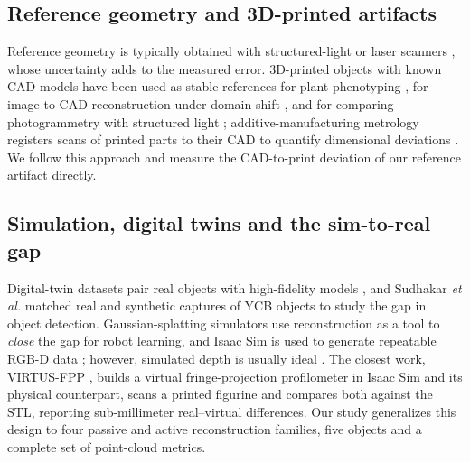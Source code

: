 \documentclass[journal]{IEEEtran}
\begin{document}
\subsection{Reference geometry and 3D-printed artifacts}
Reference geometry is typically obtained with structured-light or laser scanners
\cite{remondino2023critical,jutzi2023tls}, whose uncertainty adds to the measured error. 3D-printed objects
with known CAD models have been used as stable references for plant phenotyping \cite{boemer2024plant}, for
image-to-CAD reconstruction under domain shift \cite{realcad2026}, and for comparing photogrammetry with
structured light \cite{sensors2025industrial}; additive-manufacturing metrology registers scans of printed
parts to their CAD to quantify dimensional deviations \cite{jms2020printed}. We follow this approach and
measure the CAD-to-print deviation of our reference artifact directly.

\subsection{Simulation, digital twins and the sim-to-real gap}
Digital-twin datasets pair real objects with high-fidelity models \cite{dong2025dtc,kuang2023orb}, and
Sudhakar \emph{et al.} \cite{sudhakar2023sim2real} matched real and synthetic captures of YCB objects to
study the gap in object detection. Gaussian-splatting simulators \cite{qureshi2024splatsim,robogsim2024}
use reconstruction as a tool to \emph{close} the gap for robot learning, and Isaac Sim is used to generate
repeatable RGB-D data \cite{bonetto2023grade}; however, simulated depth is usually ideal
\cite{realitygap2025}. The closest work, VIRTUS-FPP \cite{haroon2026virtus}, builds a virtual
fringe-projection profilometer in Isaac Sim and its physical counterpart, scans a printed figurine and
compares both against the STL, reporting sub-millimeter real--virtual differences. Our study generalizes
this design to four passive and active reconstruction families, five objects and a complete set of
point-cloud metrics.

\end{document}
